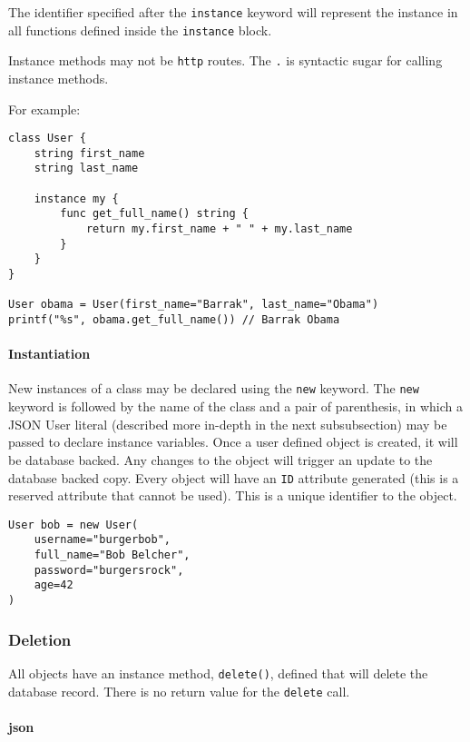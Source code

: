 The identifier specified after the \texttt{instance} keyword will
represent the instance in all functions defined inside the
\texttt{instance} block.

Instance methods may not be \texttt{http} routes. The \texttt{.} is
syntactic sugar for calling instance methods.

For example:

\begin{verbatim}
class User {
    string first_name
    string last_name

    instance my {
        func get_full_name() string {
            return my.first_name + " " + my.last_name
        }
    }
}

User obama = User(first_name="Barrak", last_name="Obama")
printf("%s", obama.get_full_name()) // Barrak Obama
\end{verbatim}

\paragraph{Instantiation}\label{instantiation}

New instances of a class may be declared using the \texttt{new} keyword.
The \texttt{new} keyword is followed by the name of the class and a pair
of parenthesis, in which a JSON User literal (described more in-depth in
the next subsubsection) may be passed to declare instance variables. Once a
user defined object is created, it will be database backed. Any changes
to the object will trigger an update to the database backed copy. Every
object will have an \texttt{ID} attribute generated (this is a reserved
attribute that cannot be used). This is a unique identifier to the
object.

\begin{verbatim}
User bob = new User(
    username="burgerbob",
    full_name="Bob Belcher",
    password="burgersrock",
    age=42
)
\end{verbatim}

\subsubsection*{Deletion}\label{deletion}

All objects have an instance method, \texttt{delete()}, defined that
will delete the database record. There is no return value for the
\texttt{delete} call.

\paragraph{json}\label{json-1}

